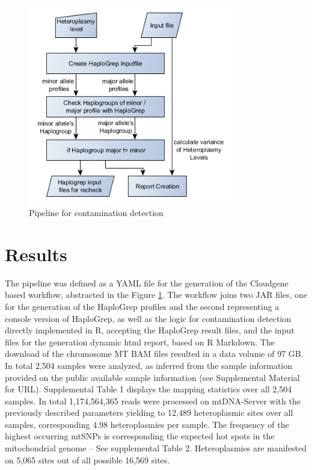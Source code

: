 \begin{figure}[!ht]
    \centering
    \includegraphics[width=0.8\textwidth]{images/dataflow.png}
    \caption[Pipeline for contamination detection]{Pipeline for contamination detection } 
    \label{cont:workflow}
\end{figure}

 
\section{Results}\label{cont:result}
The pipeline was defined as a YAML file for the generation of the Cloudgene based workflow, abstracted in the Figure \ref{cont:workflow}. The workflow joins two JAR files, one for the generation of the HaploGrep profiles and the second representing a console version of HaploGrep, as well as the logic for contamination detection directly implemented in R, accepting the HaploGrep result files, and the input files for the generation dynamic html report, based on R Markdown. 
The download of the chromosome MT BAM files resulted in a data volume of 97 GB. In total 2,504 samples were analyzed, as inferred from the sample information provided on the public available sample information (see Supplemental Material for URL). Supplemental Table 1 displays the mapping statistics over all 2,504 samples. In total 1,174,564,365 reads were processed on mtDNA-Server with the previously described parameters yielding to 12,489 heteroplasmic sites over all samples, corresponding 4.98 heteroplasmies per sample. The frequency of the highest occurring mtSNPs is corresponding the expected hot spots in the mitochondrial genome – See supplemental Table 2. Heteroplasmies are manifested on 5,065 sites out of all possible 16,569 sites. 

